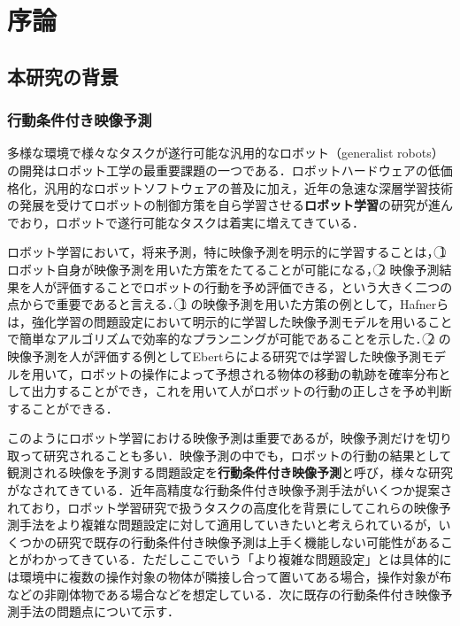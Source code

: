 \chapter{序論}
\label{chap:introduction}
\section{本研究の背景}
\subsection{行動条件付き映像予測}
多様な環境で様々なタスクが遂行可能な汎用的なロボット（generalist robots）の開発はロボット工学の最重要課題の一つである．ロボットハードウェアの低価格化，汎用的なロボットソフトウェアの普及に加え，近年の急速な深層学習技術の発展を受けてロボットの制御方策を自ら学習させる{\bf ロボット学習}の研究が進んでおり，ロボットで遂行可能なタスクは着実に増えてきている．

ロボット学習において，将来予測，特に映像予測を明示的に学習することは，\textcircled{\scriptsize 1} ロボット自身が映像予測を用いた方策をたてることが可能になる，\textcircled{\scriptsize 2} 映像予測結果を人が評価することでロボットの行動を予め評価できる，という大きく二つの点からで重要であると言える．\textcircled{\scriptsize 1} の映像予測を用いた方策の例として，Hafnerら\cite{hafner2019planet}は，強化学習の問題設定において明示的に学習した映像予測モデルを用いることで簡単なアルゴリズムで効率的なプランニングが可能であることを示した．\textcircled{\scriptsize 2} の映像予測を人が評価する例としてEbertらによる研究\cite{ebert2018visual}では学習した映像予測モデルを用いて，ロボットの操作によって予想される物体の移動の軌跡を確率分布として出力することができ，これを用いて人がロボットの行動の正しさを予め判断することができる．

このようにロボット学習における映像予測は重要であるが，映像予測だけを切り取って研究されることも多い．映像予測の中でも，ロボットの行動の結果として観測される映像を予測する問題設定を{\bf 行動条件付き映像予測}と呼び，様々な研究がなされてきている．近年高精度な行動条件付き映像予測手法がいくつか提案されており，ロボット学習研究で扱うタスクの高度化を背景にしてこれらの映像予測手法をより複雑な問題設定に対して適用していきたいと考えられているが，いくつかの研究で既存の行動条件付き映像予測は上手く機能しない可能性があることがわかってきている．ただしここでいう「より複雑な問題設定」とは具体的には環境中に複数の操作対象の物体が隣接し合って置いてある場合，操作対象が布などの非剛体物である場合などを想定している．次に既存の行動条件付き映像予測手法の問題点について示す．



